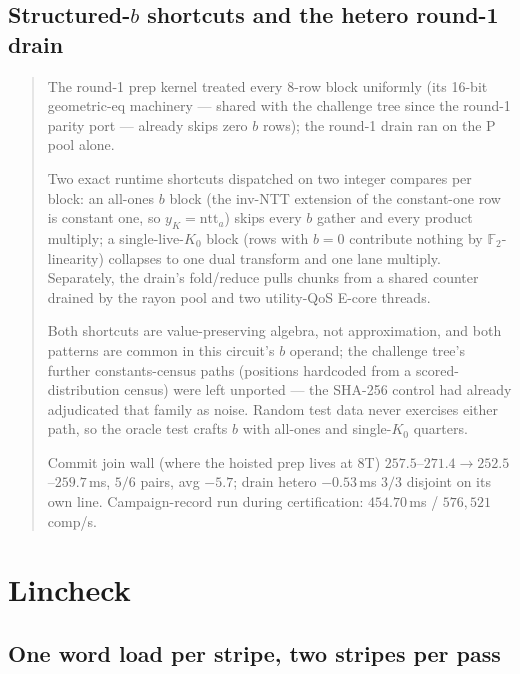 \documentclass[11pt]{article}
\newenvironment{optsummary}{%
  \begin{quote}\small
  \begin{description}
  \setlength{\itemsep}{1pt}\setlength{\parsep}{0pt}\setlength{\topsep}{2pt}
}{%
  \end{description}
  \end{quote}
}
\begin{document}
\subsection{Structured-$b$ shortcuts and the hetero round-1 drain}
\label{sec:structuredb}

\begin{optsummary}
\item[Baseline:] The round-1 prep kernel treated every 8-row block uniformly (its 16-bit geometric-eq machinery --- shared with the challenge tree since the round-1 parity port --- already skips zero $b$ rows); the round-1 drain ran on the P pool alone.
\item[Improvement:] Two exact runtime shortcuts dispatched on two integer compares per block: an all-ones $b$ block (the inv-NTT extension of the constant-one row is constant one, so $y_K = \mathrm{ntt}_a$) skips every $b$ gather and every product multiply; a single-live-$K_0$ block (rows with $b = 0$ contribute nothing by $\mathbb{F}_2$-linearity) collapses to one dual transform and one lane multiply. Separately, the drain's fold/reduce pulls chunks from a shared counter drained by the rayon pool and two utility-QoS E-core threads.
\item[Mechanism:] Both shortcuts are value-preserving algebra, not approximation, and both patterns are common in this circuit's $b$ operand; the challenge tree's further constants-census paths (positions hardcoded from a scored-distribution census) were left unported --- the SHA-256 control had already adjudicated that family as noise. Random test data never exercises either path, so the oracle test crafts $b$ with all-ones and single-$K_0$ quarters.
\item[Result:] Commit join wall (where the hoisted prep lives at 8T) $257.5$--$271.4\to252.5$--$259.7\,$ms, $5/6$ pairs, avg $-5.7$; drain hetero $-0.53\,$ms $3/3$ disjoint on its own line. Campaign-record run during certification: $454.70\,$ms / $576{,}521$ comp/s.
\end{optsummary}

\section{Lincheck}

\subsection{One word load per stripe, two stripes per pass}
\label{sec:lcfold}
\end{document}
